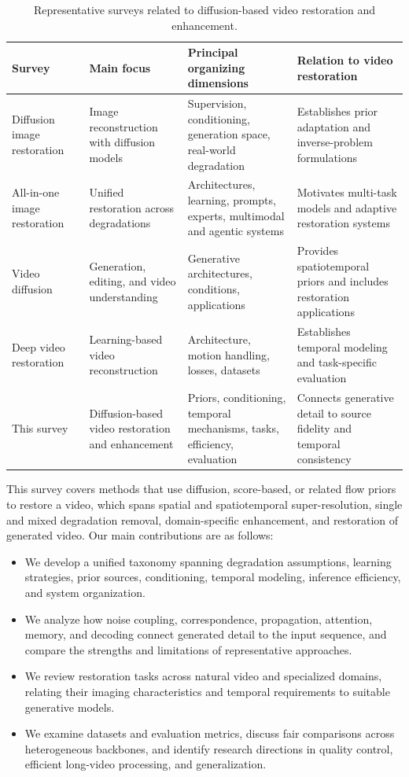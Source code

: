 \begin{table}[t]
\caption{Representative surveys related to diffusion-based video restoration and enhancement.}
\label{tab:surveys}\centering\footnotesize
\begin{tabularx}{\textwidth}{@{}p{}YYY@{}}\toprule
Survey & Main focus & Principal organizing dimensions & Relation to video restoration \\\midrule
Diffusion image restoration~\cite{irsurvey} & Image reconstruction with diffusion models & Supervision, conditioning, generation space, real-world degradation & Establishes prior adaptation and inverse-problem formulations \\
All-in-one image restoration~\cite{aiosurvey} & Unified restoration across degradations & Architectures, learning, prompts, experts, multimodal and agentic systems & Motivates multi-task models and adaptive restoration systems \\
Video diffusion~\cite{videodiffsurvey} & Generation, editing, and video understanding & Generative architectures, conditions, applications & Provides spatiotemporal priors and includes restoration applications \\
Deep video restoration~\cite{vrsurvey} & Learning-based video reconstruction & Architecture, motion handling, losses, datasets & Establishes temporal modeling and task-specific evaluation \\
This survey & Diffusion-based video restoration and enhancement & Priors, conditioning, temporal mechanisms, tasks, efficiency, evaluation & Connects generative detail to source fidelity and temporal consistency \\\bottomrule
\end{tabularx}
\end{table}

This survey covers methods that use diffusion, score-based, or related flow priors to restore a video, which spans spatial and spatiotemporal super-resolution, single and mixed degradation removal, domain-specific enhancement, and restoration of generated video. Our main contributions are as follows:
\begin{itemize}
\item We develop a unified taxonomy spanning degradation assumptions, learning strategies, prior sources, conditioning, temporal modeling, inference efficiency, and system organization.
\item We analyze how noise coupling, correspondence, propagation, attention, memory, and decoding connect generated detail to the input sequence, and compare the strengths and limitations of representative approaches.
\item We review restoration tasks across natural video and specialized domains, relating their imaging characteristics and temporal requirements to suitable generative models.
\item We examine datasets and evaluation metrics, discuss fair comparisons across heterogeneous backbones, and identify research directions in quality control, efficient long-video processing, and generalization.
\end{itemize}

